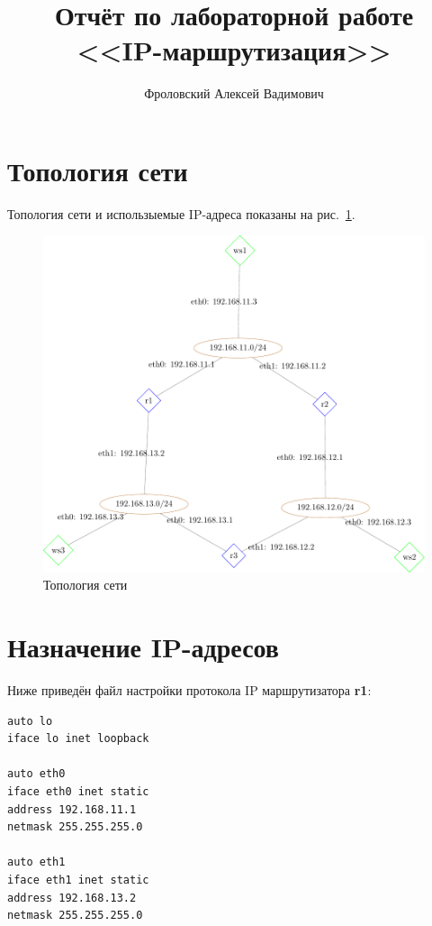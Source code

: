\documentclass[a4paper,12pt]{article}
\title{Отчёт по лабораторной работе \\ <<IP-маршрутизация>>}
\author{Фроловский Алексей Вадимович}
\begin{document}
\maketitle

\tableofcontents

\section{Топология сети}

Топология сети и использыемые IP-адреса показаны на рис.~\ref{fig:network}.

\begin{figure}
\centering
\includegraphics[width=\textwidth]{includes/network_gv.pdf}
\caption{Топология сети}
\label{fig:network}
\end{figure}


\section{Назначение IP-адресов}

Ниже приведён файл настройки протокола IP маршрутизатора \textbf{r1}:

\begin{Verbatim}
auto lo
iface lo inet loopback

auto eth0
iface eth0 inet static
address 192.168.11.1
netmask 255.255.255.0

auto eth1
iface eth1 inet static
address 192.168.13.2
netmask 255.255.255.0
\end{Verbatim}
\end{document}
